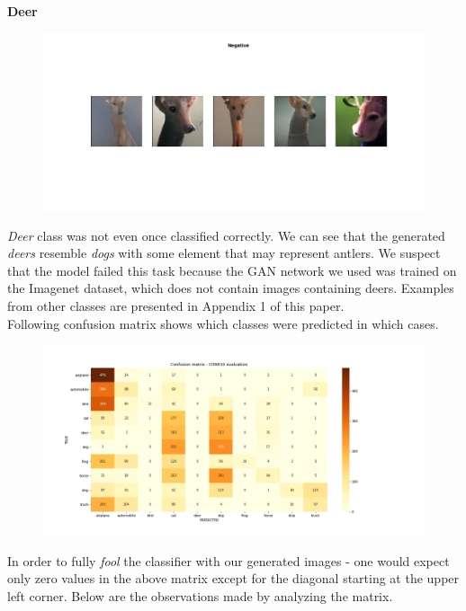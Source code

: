 \documentclass[11pt,a4paper,openany]{book}
\begin{document}
\newline
\noindent \textbf{Deer} \\
\begin{figure}[ht!]
    \centering
    \includegraphics[scale=0.40]{figs/cifar10_examples/deer.png}
\end{figure}
\newline
\noindent \textit{Deer} class was not even once classified correctly. We can see that the generated \textit{deers} resemble \textit{dogs} with some element that may represent antlers. We suspect that the model failed this task because the GAN network we used was trained on the Imagenet dataset, which does not contain images containing deers.
Examples from other classes are presented in Appendix 1 of this paper. \\
\noindent Following confusion matrix shows which classes were predicted in which cases.
\begin{figure}[ht!]
    \includegraphics[scale=0.45]{figs/cifar10_examples/confusion_matrix.png}
\end{figure}
\newline
In order to fully \textit{fool} the classifier with our generated images - one would expect only zero values in the above matrix except for the diagonal starting at the upper left corner. Below are the observations made by analyzing the matrix.
\end{document}
